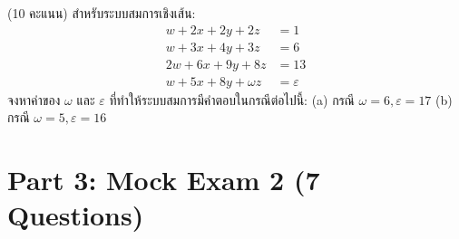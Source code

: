 ﻿\documentclass[12pt, a4paper]{exam}
\begin{document}
\begin{questions}
\question (10 คะแนน) สำหรับระบบสมการเชิงเส้น:
\[
\begin{aligned}
w + 2x + 2y + 2z &= 1 \\
w + 3x + 4y + 3z &= 6 \\
2w + 6x + 9y + 8z &= 13 \\
w + 5x + 8y + \omega z &= \varepsilon
\end{aligned}
\]
จงหาค่าของ $\omega$ และ $\varepsilon$ ที่ทำให้ระบบสมการมีคำตอบในกรณีต่อไปนี้:
(a) กรณี $\omega = 6, \varepsilon = 17$
(b) กรณี $\omega = 5, \varepsilon = 16$
\vspace{5cm}

\end{questions}

\filbreak
\section*{Part 3: Mock Exam 2 (7 Questions)}
\end{document}
